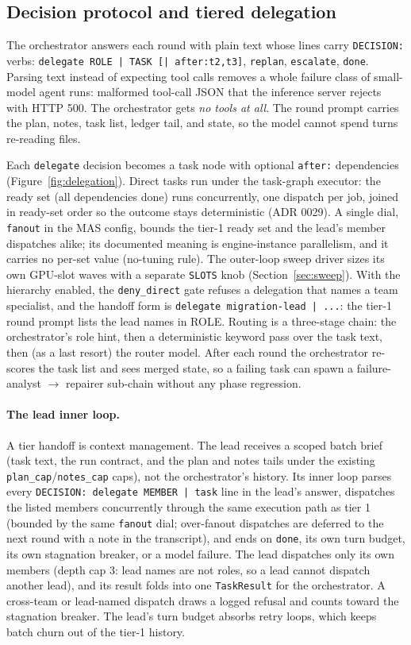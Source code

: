 \documentclass[11pt]{article}
\begin{document}
\subsection{Decision protocol and tiered delegation}

The orchestrator answers each round with plain text whose lines carry
\texttt{DECISION:} verbs: \texttt{delegate ROLE | TASK [|
  after:t2,t3]}, \texttt{replan}, \texttt{escalate},
\texttt{done}. Parsing text instead of expecting tool calls removes a
whole failure class of small-model agent runs: malformed tool-call JSON
that the inference server rejects with HTTP 500. The
orchestrator gets \emph{no tools at all}. The round prompt
carries the plan, notes, task list, ledger tail, and state, so the model
cannot spend turns re-reading files.

Each \texttt{delegate} decision becomes a task node with optional
\texttt{after:} dependencies (Figure~\ref{fig:delegation}). Direct tasks
run under the task-graph executor: the ready set (all dependencies done)
runs concurrently, one dispatch per job, joined in ready-set order so the
outcome stays deterministic (ADR 0029). A single dial, \texttt{fanout}
in the MAS config, bounds the tier-1 ready set and the lead's member
dispatches alike; its documented meaning is engine-instance
parallelism, and it carries no per-set value (no-tuning rule). The
outer-loop sweep driver sizes its own GPU-slot waves with a separate
\texttt{SLOTS} knob (Section~\ref{sec:sweep}). With the hierarchy enabled, the
\texttt{deny\_direct} gate refuses a delegation that names a team
specialist, and the handoff form is \texttt{delegate migration-lead |
  ...}: the tier-1 round prompt lists the lead names in ROLE. Routing is
a three-stage chain: the orchestrator's role hint, then a
deterministic keyword pass over the task text, then (as a last resort)
the router model. After each round the orchestrator re-scores the task
list and sees merged state, so a failing task can spawn a
failure-analyst $\rightarrow$ repairer sub-chain without any phase
regression.

\paragraph{The lead inner loop.}
A tier handoff is context management. The lead receives a scoped batch
brief (task text, the run contract, and the plan and notes tails under
the existing \texttt{plan\_cap}/\texttt{notes\_cap} caps), not the
orchestrator's history. Its inner loop parses every \texttt{DECISION:
  delegate MEMBER | task} line in the lead's answer, dispatches the
listed members concurrently through the same execution path as tier 1
(bounded by the same \texttt{fanout} dial; over-fanout dispatches are
deferred to the next round with a note in the transcript), and ends on
\texttt{done}, its own turn budget, its own stagnation breaker, or a
model failure. The lead dispatches only its own members (depth cap 3: lead names are not roles,
so a lead cannot dispatch another lead), and its result folds into one
\texttt{TaskResult} for the orchestrator. A cross-team or lead-named
dispatch draws a logged refusal and counts toward the stagnation
breaker. The lead's turn budget absorbs retry loops, which keeps batch
churn out of the tier-1 history.
\end{document}
